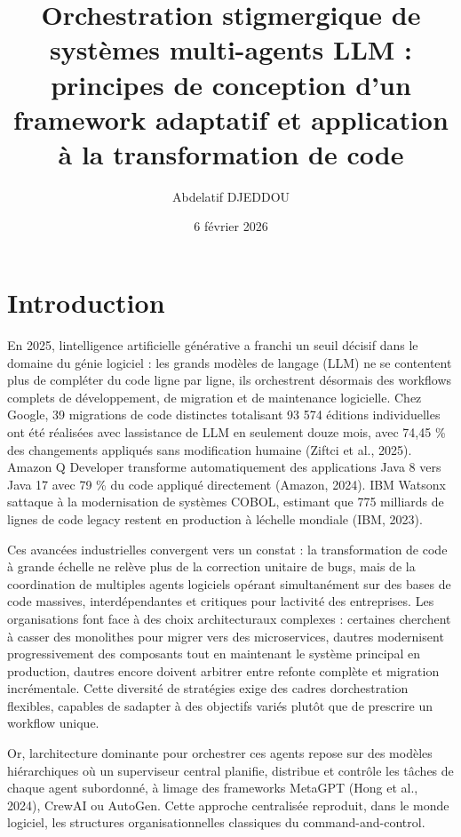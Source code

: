 \documentclass[12pt,a4paper]{article}
\title{Orchestration stigmergique de systèmes multi-agents LLM : principes de conception d'un framework adaptatif et application à la transformation de code}
\author{Abdelatif DJEDDOU}
\date{6 février 2026}
\begin{document}

\tableofcontents
\newpage

\section{Introduction}\label{introduction}

En 2025, l\textquotesingle intelligence artificielle générative a
franchi un seuil décisif dans le domaine du génie logiciel : les grands
modèles de langage (LLM) ne se contentent plus de compléter du code
ligne par ligne, ils orchestrent désormais des workflows complets de
développement, de migration et de maintenance logicielle. Chez Google,
39 migrations de code distinctes totalisant 93 574 éditions
individuelles ont été réalisées avec l\textquotesingle assistance de LLM
en seulement douze mois, avec 74,45 \% des changements appliqués sans
modification humaine (Ziftci et al., 2025). Amazon Q Developer
transforme automatiquement des applications Java 8 vers Java 17 avec 79
\% du code appliqué directement (Amazon, 2024). IBM Watsonx
s\textquotesingle attaque à la modernisation de systèmes COBOL, estimant
que 775 milliards de lignes de code legacy restent en production à
l\textquotesingle échelle mondiale (IBM, 2023).

Ces avancées industrielles convergent vers un constat : la
transformation de code à grande échelle ne relève plus de la correction
unitaire de bugs, mais de la coordination de multiples agents logiciels
opérant simultanément sur des bases de code massives, interdépendantes
et critiques pour l\textquotesingle activité des entreprises.
Les organisations font face à des choix architecturaux complexes :
certaines cherchent à casser des monolithes pour migrer vers des
microservices, d\textquotesingle autres modernisent progressivement
des composants tout en maintenant le système principal en production,
d\textquotesingle autres encore doivent arbitrer entre refonte complète
et migration incrémentale. Cette diversité de stratégies exige des
cadres d\textquotesingle orchestration flexibles, capables de
s\textquotesingle adapter à des objectifs variés plutôt que de
prescrire un workflow unique.

Or, l\textquotesingle architecture dominante pour orchestrer ces agents
repose sur des modèles hiérarchiques où un superviseur central planifie,
distribue et contrôle les tâches de chaque agent subordonné, à
l\textquotesingle image des frameworks MetaGPT (Hong et al., 2024),
CrewAI ou AutoGen. Cette approche centralisée reproduit, dans le monde
logiciel, les structures organisationnelles classiques du
command-and-control.
\end{document}
